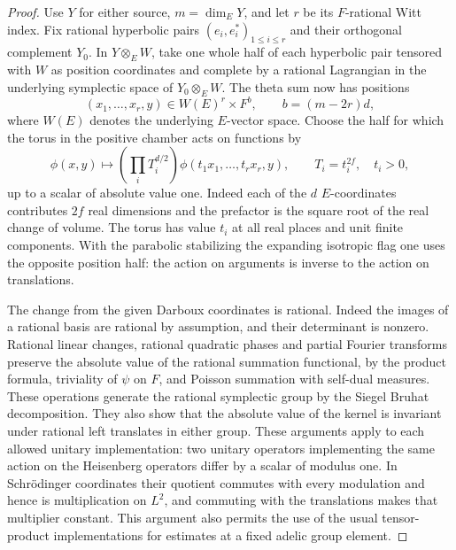 \begin{proof}
Use \(Y\) for either source, \(m=\dim_EY\), and let \(r\) be its
\(F\)-rational Witt index. Fix rational hyperbolic pairs
\((e_i,e_i^*)_{1\le i\le r}\) and their orthogonal complement \(Y_0\).
In \(Y\otimes_EW\), take one whole half of each hyperbolic pair
tensored with \(W\) as position coordinates and complete by a rational
Lagrangian in the underlying symplectic space of \(Y_0\otimes_E W\).
The theta sum now has positions
\[
        (x_1,\ldots,x_r,y)\in W(E)^r\times F^b,\qquad
             b=(m-2r)d ,
\]
where \(W(E)\) denotes the underlying \(E\)-vector space.
Choose the half for which the torus in the positive chamber acts on
functions by
\[
 \phi(x,y)\longmapsto
       \left(\prod_i T_i^{d/2}\right)
       \phi(t_1x_1,\ldots,t_rx_r,y),\qquad
          T_i=t_i^{2f},\quad t_i>0 ,
 \tag{*}
\]
up to a scalar of absolute value one. Indeed each of the \(d\)
\(E\)-coordinates contributes \(2f\) real dimensions and the
prefactor is the square root of the real change of volume. The torus
has value \(t_i\) at all real places and unit finite components.
With the parabolic stabilizing the expanding isotropic flag one uses
the opposite position half: the action on arguments is inverse to
the action on translations.

The change from the given Darboux coordinates is rational. Indeed the
images of a rational basis are rational by assumption, and their
determinant is nonzero. Rational linear changes, rational quadratic
phases and partial Fourier transforms preserve the absolute value of
the rational summation functional, by the product formula, triviality
of \(\psi\) on \(F\), and Poisson summation with self-dual measures.
These operations generate the rational symplectic group by the Siegel
Bruhat decomposition. They also show that the absolute value of the
kernel is invariant under rational left translates in either group.
These arguments apply to each allowed unitary implementation: two
unitary operators implementing the same action on the Heisenberg
operators differ by a scalar of modulus one. In Schr\"odinger
coordinates their quotient commutes with every modulation and hence
is multiplication on \(L^2\), and commuting with the translations
makes that multiplier constant. This argument also permits the
use of the usual tensor-product implementations for estimates at a
fixed adelic group element.


\end{proof}
